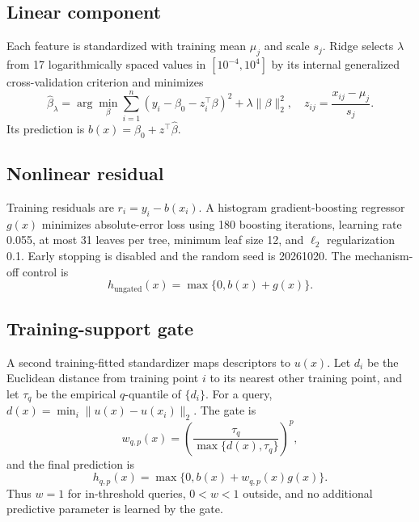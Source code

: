 \documentclass[11pt]{article}
\begin{document}
\subsection{Linear component}
Each feature is standardized with training mean $\mu_j$ and scale $s_j$. Ridge
selects $\lambda$ from 17 logarithmically spaced values in $[10^{-4},10^4]$ by
its internal generalized cross-validation criterion and minimizes
\begin{equation}
 \hat\beta_\lambda = \arg\min_\beta
 \sum_{i=1}^{n}(y_i-\beta_0-z_i^\top\beta)^2+\lambda\|\beta\|_2^2,
 \quad z_{ij}=\frac{x_{ij}-\mu_j}{s_j}.
\end{equation}
Its prediction is $b(x)=\beta_0+z^\top\hat\beta$.

\subsection{Nonlinear residual}
Training residuals are $r_i=y_i-b(x_i)$. A histogram gradient-boosting
regressor $g(x)$ minimizes absolute-error loss using 180 boosting iterations,
learning rate 0.055, at most 31 leaves per tree, minimum leaf size 12, and
$\ell_2$ regularization 0.1. Early stopping is disabled and the random seed is
20261020. The mechanism-off control is
\begin{equation}
 h_{\mathrm{ungated}}(x)=\max\{0,b(x)+g(x)\}.
\end{equation}

\subsection{Training-support gate}
A second training-fitted standardizer maps descriptors to $u(x)$. Let
$d_i$ be the Euclidean distance from training point $i$ to its nearest other
training point, and let $\tau_q$ be the empirical $q$-quantile of $\{d_i\}$.
For a query, $d(x)=\min_i\|u(x)-u(x_i)\|_2$. The gate is
\begin{equation}
 w_{q,p}(x)=\left(\frac{\tau_q}{\max\{d(x),\tau_q\}}\right)^p,
\end{equation}
and the final prediction is
\begin{equation}
 h_{q,p}(x)=\max\{0,b(x)+w_{q,p}(x)g(x)\}.
\end{equation}
Thus $w=1$ for in-threshold queries, $0<w<1$ outside, and no additional
predictive parameter is learned by the gate.
\end{document}
